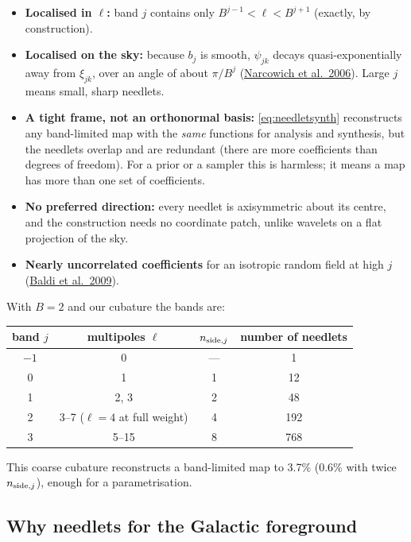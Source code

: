\documentclass[11pt,a4paper]{article}
\begin{document}
\begin{itemize}
  \item \textbf{Localised in $\ell$:} band $j$ contains only $B^{j-1}<\ell<B^{j+1}$
        (exactly, by construction).
  \item \textbf{Localised on the sky:} because $b_j$ is smooth, $\psi_{jk}$ decays
        quasi-exponentially away from $\xi_{jk}$, over an angle of about $\pi/B^j$
        (\href{https://doi.org/10.1137/040614359}{Narcowich et al.\ 2006}). Large $j$
        means small, sharp needlets.
  \item \textbf{A tight frame, not an orthonormal basis:} \cref{eq:needletsynth}
        reconstructs any band-limited map with the \emph{same} functions for analysis and
        synthesis, but the needlets overlap and are redundant (there are more
        coefficients than degrees of freedom). For a prior or a sampler this is
        harmless; it means a map has more than one set of coefficients.
  \item \textbf{No preferred direction:} every needlet is axisymmetric about its
        centre, and the construction needs no coordinate patch, unlike wavelets on a
        flat projection of the sky.
  \item \textbf{Nearly uncorrelated coefficients} for an isotropic random field at high
        $j$ (\href{https://doi.org/10.1214/08-AOS601}{Baldi et al.\ 2009}).
\end{itemize}
With $B=2$ and our cubature the bands are:
\begin{center}
\small
\begin{tabular}{@{}cccc@{}}
\toprule
band $j$ & multipoles $\ell$ & $n_{{\rm side},j}$ & number of needlets \\
\midrule
$-1$ & 0 & --- & 1 \\
0 & 1 & 1 & 12 \\
1 & 2, 3 & 2 & 48 \\
2 & 3--7 ($\ell=4$ at full weight) & 4 & 192 \\
3 & 5--15 & 8 & 768 \\
\bottomrule
\end{tabular}
\end{center}
This coarse cubature reconstructs a band-limited map to 3.7\% (0.6\% with twice
$n_{{\rm side},j}$), enough for a parametrisation.

\subsection{Why needlets for the Galactic foreground}\label{sec:whyneedlets}
\end{document}
